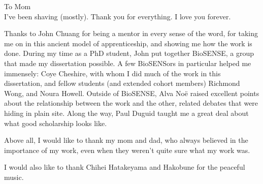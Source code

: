 \begin{frontmatter}

\begin{dedication}
\null\vfil
\begin{center}


To Mom\\\vspace{12pt} I've been shaving (mostly). Thank you for everything. I
love you forever.
\end{center}
\vfil\null
\end{dedication}


\tableofcontents
\clearpage
\listoffigures
\clearpage
\listoftables

\begin{acknowledgements}
Thanks to John Chuang for being a mentor in every sense of the word, for taking
me on in this ancient model of apprenticeship, and showing me how the work is
done. During my time as a PhD student, John put together BioSENSE, a group that
made my dissertation possible. A few BioSENSors in particular helped me
immensely: Coye Cheshire, with whom I did much of the work in this dissertation,
and fellow students (and extended cohort members) Richmond Wong, and Noura
Howell. Outside of BioSENSE, Alva Noë raised excellent points about the
relationship between the work and the other, related debates that were hiding in
plain site. Along the way, Paul Duguid taught me a great deal about what good
scholarship looks like.

Above all, I would like to thank my mom and dad, who always believed in the
importance of my work, even when they weren't quite sure what my work was.

I would also like to thank Chihei Hatakeyama and Hakobune for the peaceful music.
\end{acknowledgements}





\end{frontmatter}
